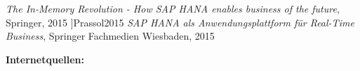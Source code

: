 \newpage
{}
  \begin{thebibliography}{}



%

	 {\sl The In-Memory Revolution - How SAP HANA enables business of the future}, Springer, 2015
	\bibitem[Prassol, P. (2015)]]{Prassol2015} {\sl SAP HANA als Anwendungsplattform für Real-Time Business}, Springer Fachmedien Wiesbaden, 2015
	
	\textbf{Internetquellen:}


\end{thebibliography}
